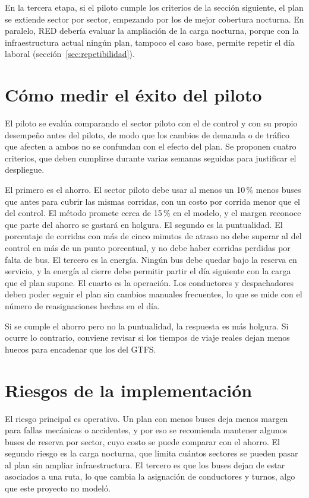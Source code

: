 En la tercera etapa, si el piloto cumple los criterios de la sección siguiente, el plan se extiende sector por sector, empezando por los de mejor cobertura nocturna. En paralelo, RED debería evaluar la ampliación de la carga nocturna, porque con la infraestructura actual ningún plan, tampoco el caso base, permite repetir el día laboral (sección~\ref{sec:repetibilidad}).

\section{Cómo medir el éxito del piloto}
\label{sec:exito}

El piloto se evalúa comparando el sector piloto con el de control y con su propio desempeño antes del piloto, de modo que los cambios de demanda o de tráfico que afecten a ambos no se confundan con el efecto del plan. Se proponen cuatro criterios, que deben cumplirse durante varias semanas seguidas para justificar el despliegue.

El primero es el ahorro. El sector piloto debe usar al menos un 10\,\% menos buses que antes para cubrir las mismas corridas, con un costo por corrida menor que el del control. El método promete cerca de 15\,\% en el modelo, y el margen reconoce que parte del ahorro se gastará en holgura. El segundo es la puntualidad. El porcentaje de corridas con más de cinco minutos de atraso no debe superar al del control en más de un punto porcentual, y no debe haber corridas perdidas por falta de bus. El tercero es la energía. Ningún bus debe quedar bajo la reserva en servicio, y la energía al cierre debe permitir partir el día siguiente con la carga que el plan supone. El cuarto es la operación. Los conductores y despachadores deben poder seguir el plan sin cambios manuales frecuentes, lo que se mide con el número de reasignaciones hechas en el día.

Si se cumple el ahorro pero no la puntualidad, la respuesta es más holgura. Si ocurre lo contrario, conviene revisar si los tiempos de viaje reales dejan menos huecos para encadenar que los del GTFS.

\section{Riesgos de la implementación}
\label{sec:riesgos}

El riesgo principal es operativo. Un plan con menos buses deja menos margen para fallas mecánicas o accidentes, y por eso se recomienda mantener algunos buses de reserva por sector, cuyo costo se puede comparar con el ahorro. El segundo riesgo es la carga nocturna, que limita cuántos sectores se pueden pasar al plan sin ampliar infraestructura. El tercero es que los buses dejan de estar asociados a una ruta, lo que cambia la asignación de conductores y turnos, algo que este proyecto no modeló.
